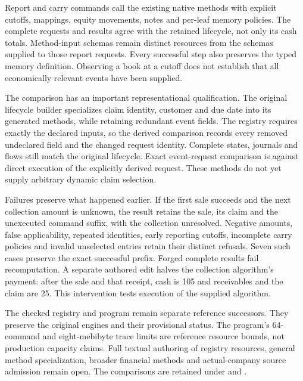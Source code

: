 Report and carry commands call the existing native methods with explicit
cutoffs, mappings, equity movements, notes and per-leaf memory policies. The
complete requests and results agree with the retained lifecycle, not only its
cash totals. Method-input schemas remain distinct resources from the schemas
supplied to those report requests. Every successful step also preserves the
typed memory definition. Observing a book at a cutoff does not establish that
all economically relevant events have been supplied.

The comparison has an important representational qualification. The original
lifecycle builder specializes claim identity, customer and due date into its
generated methods, while retaining redundant event fields. The registry
requires exactly the declared inputs, so the derived comparison records every
removed undeclared field and the changed request identity. Complete states,
journals and flows still match the original lifecycle. Exact event-request
comparison is against direct execution of the explicitly derived request.
These methods do not yet supply arbitrary dynamic claim selection.

Failures preserve what happened earlier. If the first sale succeeds and the
next collection amount is unknown, the result retains the sale, its claim and
the unexecuted command suffix, with the collection unresolved. Negative amounts,
false applicability, repeated identities, early reporting cutoffs, incomplete
carry policies and invalid unselected entries retain their distinct refusals.
Seven such cases preserve the exact successful prefix. Forged complete results
fail recomputation. A separate authored edit halves the collection algorithm's
payment: after the sale and that receipt, cash is 105 and receivables and the
claim are 25. This intervention tests execution of the supplied algorithm.

The checked registry and program remain separate reference successors. They
preserve the original engines and their provisional status. The program's
64-command and eight-mebibyte trace limits are reference resource bounds,
not production capacity claims. Full textual authoring of registry resources,
general method specialization, broader financial methods and actual-company
source admission remain open. The comparisons are retained under
 and
.
